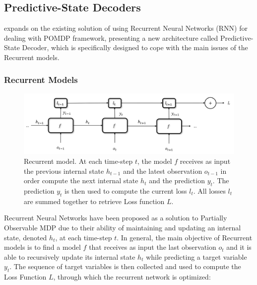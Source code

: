         \newpage
        \subsection{Predictive-State Decoders}
            \label{subs:psd}
             expands on the existing solution of using Recurrent Neural Networks (RNN) for dealing with POMDP framework, presenting a new architecture called Predictive-State Decoder, which is specifically designed to cope with the main issues of the Recurrent models. 
            
            \subsubsection{Recurrent Models}
                
                \begin{figure}[t]
                    \centering
                    \includegraphics[width=15cm, keepaspectratio]{images/pomdp/pomdp_rnn.png}
                    \caption{Recurrent model. At each time-step $t$, the model $f$ receives as input the previous internal state $h_{t-1}$ and the latest observation $o_{t-1}$ in order compute the next internal state $h_{t}$ and the prediction $y_{t}$. The prediction $y_t$ is then used to compute the current loss $l_t$. All losses $l_t$ are summed together to retrieve Loss function $L$.}
                    \label{fig:pomdp_rnn}
                \end{figure}
                
                Recurrent Neural Networks have been proposed as a solution to Partially Observable MDP due to their ability of maintaining and updating an internal state, denoted $h_t$, at each time-step $t$. In general, the main objective of Recurrent models is to find a model $f$ that receives as input the last observation $o_t$ and it is able to recursively update its internal state $h_t$ while predicting a target variable $y_t$. The sequence of target variables is then collected and used to compute the Loss Function $L$, through which the recurrent network is optimized:
                

